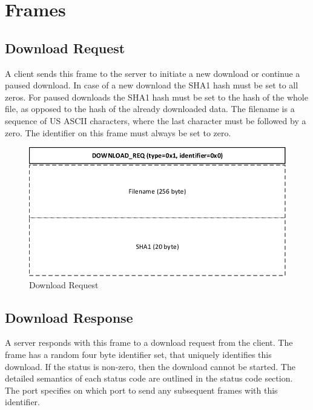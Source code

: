 \documentclass[]{article}
\begin{document}
\section{Frames}

\subsection{Download Request}

A client sends this frame to the server to initiate a new download
or continue a paused download. In case of a new download the SHA1
hash must be set to all zeros. For paused downloads the SHA1 hash
must be set to the hash of the whole file, as opposed to the
hash of the already downloaded data. The filename is a sequence
of US ASCII characters, where the last character must be followed
by a zero. The identifier on this frame must always be set to zero. 

\begin{figure}[H]
\centering
\includegraphics[width=\textwidth]{frames/download-req.pdf}
\caption{Download Request}
\label{DOWNLOAD-REQ}
\end{figure}

\subsection{Download Response}

A server responds with this frame to a download request from the
client. The frame has a random four byte identifier set, that
uniquely identifies this download. If the status is non-zero, 
then the download cannot be
started. The detailed semantics of each status code are outlined
in the status code section. The port specifies on which port to
send any subsequent frames with this identifier.
\end{document}
